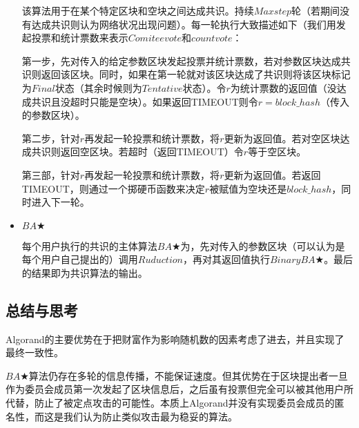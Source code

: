 \begin{itemize}
     该算法用于在某个特定区块和空块之间达成共识。持续$Maxstep$轮（若期间没有达成共识则认为网络状况出现问题）。每一轮执行大致描述如下（我们用发起投票和统计票数来表示$Comiteevote$和$countvote$：
     
     第一步，先对传入的给定参数区块发起投票并统计票数，若对参数区块达成共识则返回该区块。同时，如果在第一轮就对该区块达成了共识则将该区块标记为$Final$状态（其余时候则为$Tentative$状态）。令$r$为统计票数的返回值（没达成共识且没超时只能是空块）。如果返回TIMEOUT则令$r=block\_hash$（传入的参数区块）。
     
     第二步，针对$r$再发起一轮投票和统计票数，将$r$更新为返回值。若对空区块达成共识则返回空区块。若超时（返回TIMEOUT）令$r$等于空区块。
     
     第三部，针对$r$再发起一轮投票和统计票数，将$r$更新为返回值。若返回TIMEOUT，则通过一个掷硬币函数来决定$r$被赋值为空块还是$block\_hash$，同时进入下一轮。
     
     \item $BA\bigstar$
     
     每个用户执行的共识的主体算法$BA\bigstar$为，先对传入的参数区块（可以认为是每个用户自己提出的）调用$Ruduction$，再对其返回值执行$BinaryBA\bigstar$。最后的结果即为共识算法的输出。	
\end{itemize}

\subsection{总结与思考}
Algorand的主要优势在于把财富作为影响随机数的因素考虑了进去，并且实现了最终一致性。

$BA\bigstar$算法仍存在多轮的信息传播，不能保证速度。但其优势在于区块提出者一旦作为委员会成员第一次发起了区块信息后，之后虽有投票但完全可以被其他用户所代替，防止了被定点攻击的可能性。本质上Algorand并没有实现委员会成员的匿名性，而这是我们认为防止类似攻击最为稳妥的算法。
     
    
     

